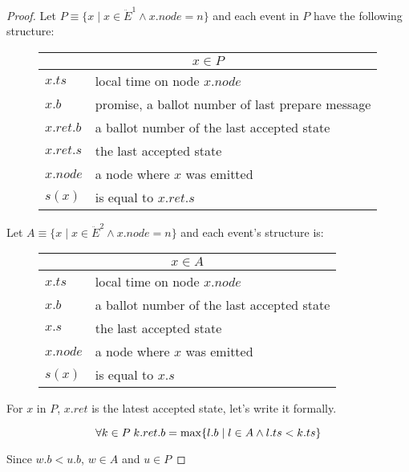 \documentclass[12pt]{article}
\theoremstyle{definition}
\begin{document}
\begin{appendices}
\begin{proof}
  Let $P \equiv \{ x \;|\; x \in \ddot{E}^1 \land x.node = n\}$ and each event in $P$ have the following structure:

  \begin{figure}[!h]
    \centering
    \begin{tabular}{|l|l|}
    \hline
    \multicolumn{2}{|c|}{$x \in P$}\\
    \hline
    $x.ts$ & local time on node $x.node$\\
    \hline
    $x.b$ & promise, a ballot number of last prepare message\\
    \hline
    $x.ret.b$ & a ballot number of the last accepted state\\
    \hline
    $x.ret.s$ & the last accepted state\\
    \hline
    $x.node$ & a node where $x$ was emitted\\
    \hline
    \hline
    $s(x)$ & is equal to $x.ret.s$\\
    \hline
    \end{tabular}
  \end{figure}
  
  Let $A \equiv \{ x \;|\; x \in \ddot{E}^2 \land x.node = n \}$ and each event's structure is:

  \begin{figure}[!h]
    \centering
    \begin{tabular}{|l|l|}
    \hline
    \multicolumn{2}{|c|}{$x \in A$}\\
    \hline
    $x.ts$ & local time on node $x.node$\\
    \hline
    $x.b$ & a ballot number of the last accepted state\\
    \hline
    $x.s$ & the last accepted state\\
    \hline
    $x.node$ & a node where $x$ was emitted\\
    \hline
    \hline
    $s(x)$ & is equal to $x.s$\\
    \hline
    \end{tabular}
  \end{figure}

  For $x$ in $P$, $x.ret$ is the latest accepted state, let's write it formally.

  \begin{equation} \label{eq:last}
    \forall k \in P \; k.ret.b = \max \{ l.b \;|\;l \in A \land l.ts < k.ts \} \\
  \end{equation}

  Since $w.b < u.b$, $w \in A$ and $u \in P$


\end{proof}
\end{appendices}
\end{document}
